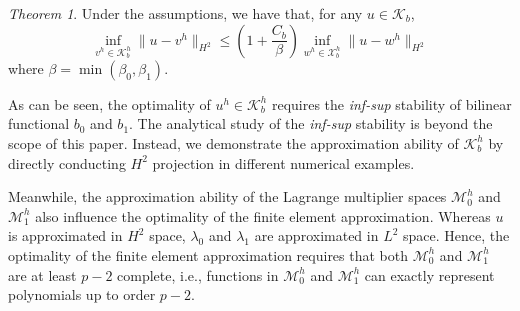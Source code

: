 \documentclass[preprint,12pt]{elsarticle}
\theoremstyle{remark}
\newtheorem{theorem}{Theorem}
\begin{document}
\begin{theorem}
    Under the assumptions, we have that, for any $u\in\mathcal{K}_b$,  
    \begin{equation}
        \inf_{v^h\in{\mathcal{K}_b^h}}\|{u-v^h}\|_{H^2}\leq\left({1+\frac{C_b}{\beta}}\right)\inf_{w^h\in{\mathcal{X}_b^h}}\|{u-w^h}\|_{H^2}
    \end{equation}
    where $\beta=\min\left({\beta_{0},\beta_{1}}\right)$.
\end{theorem}

As can be seen, the optimality of $u^h\in\mathcal{K}_b^h$ requires the \textit{inf-sup} stability of bilinear functional $b_0$ and $b_1$. The analytical study of the \textit{inf-sup} stability is beyond the scope of this paper. Instead, we demonstrate the approximation ability of $\mathcal{K}_b^h$ by directly conducting $H^2$ projection in different numerical examples.\par

Meanwhile, the approximation ability of the Lagrange multiplier spaces $\mathcal{M}_0^h$ and $\mathcal{M}_1^h$ also influence the optimality of the finite element approximation. Whereas $u$ is approximated in $H^2$ space, $\lambda_0$ and $\lambda_1$ are approximated in $L^2$ space. Hence, the optimality of the finite element approximation requires that both $\mathcal{M}_0^h$ and $\mathcal{M}_1^h$ are at least $p-2$ complete, i.e., functions in $\mathcal{M}_0^h$ and $\mathcal{M}_1^h$ can exactly represent polynomials up to order $p-2$.
\end{document}
